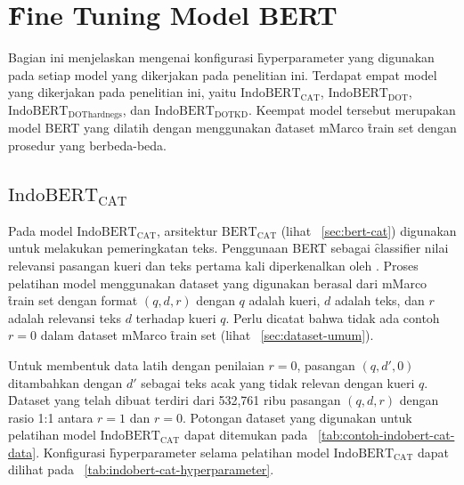 \section{\f{Fine Tuning} Model BERT}
\label{sec:finetuning}

Bagian ini menjelaskan mengenai konfigurasi \f{hyperparameter} yang digunakan pada setiap model yang dikerjakan pada penelitian ini. Terdapat empat model yang dikerjakan pada penelitian ini, yaitu $\text{IndoBERT}_{\text{CAT}}$, $\text{IndoBERT}_{\text{DOT}}$, $\text{IndoBERT}_{\text{DOThardnegs}}$, dan $\text{IndoBERT}_{\text{DOTKD}}$. Keempat model tersebut merupakan model BERT yang dilatih dengan menggunakan \f{dataset} mMarco \f{train set} dengan prosedur yang berbeda-beda.

\subsection{$\text{IndoBERT}_{\text{CAT}}$}

Pada model $\text{IndoBERT}_{\text{CAT}}$, arsitektur $\text{BERT}_\text{CAT}$ (lihat \sect~\ref{sec:bert-cat}) digunakan untuk melakukan pemeringkatan teks. Penggunaan BERT sebagai \f{classifier} nilai relevansi pasangan kueri dan teks pertama kali diperkenalkan oleh \cite{firstRerankingBert}. Proses pelatihan model menggunakan \f{dataset} yang digunakan berasal dari mMarco \f{train set} dengan format $(q, d, r)$ dengan $q$ adalah kueri, $d$ adalah teks, dan $r$ adalah relevansi teks $d$ terhadap kueri $q$. Perlu dicatat bahwa tidak ada contoh $r=0$ dalam \f{dataset} mMarco \f{train set} (lihat \sect~\ref{sec:dataset-umum}).

Untuk membentuk data latih dengan penilaian $r=0$, pasangan $(q, d',0)$ ditambahkan dengan $d'$ sebagai teks acak yang tidak relevan dengan kueri $q$. \f{Dataset} yang telah dibuat terdiri dari 532,761 ribu pasangan $(q, d, r)$ dengan rasio 1:1 antara $r=1$ dan $r=0$. Potongan \f{dataset} yang digunakan untuk pelatihan model $\text{IndoBERT}_{\text{CAT}}$ dapat ditemukan pada \tab~\ref{tab:contoh-indobert-cat-data}. Konfigurasi \f{hyperparameter} selama pelatihan model $\text{IndoBERT}_{\text{CAT}}$ dapat  dilihat pada \tab~\ref{tab:indobert-cat-hyperparameter}.

